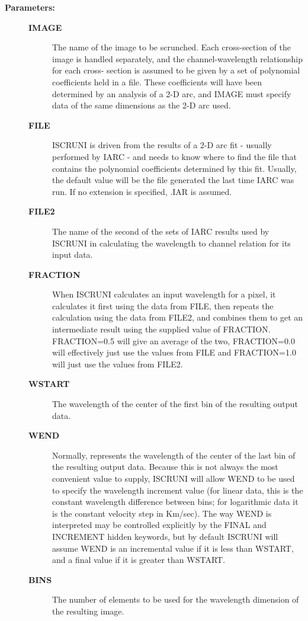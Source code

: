 \begin{description}
\item [{\bf Parameters:}]
\begin{description}
\item [{\bf IMAGE}]
 The name of the image to be scrunched.  Each
 cross-section of the image is handled separately, and
 the channel-wavelength relationship for each cross-
 section is assumed to be given by a set of polynomial
 coefficients held in a file.  These coefficients will
 have been determined by an analysis of a 2-D arc, and
 IMAGE must specify data of the same dimensions as the
 2-D arc used.
\item [{\bf FILE}]
 ISCRUNI is driven from the results of a 2-D arc fit -
 usually performed by IARC - and needs to know where to
 find the file that contains the polynomial coefficients
 determined by this fit.  Usually, the default value will
 be the file generated the last time IARC was run.  If no
 extension is specified, .IAR is assumed.
\item [{\bf FILE2}]
 The name of the second of the sets of IARC
 results used by ISCRUNI in calculating the wavelength to
 channel relation for its input data.
\item [{\bf FRACTION}]
 When ISCRUNI calculates an input wavelength for a pixel,
 it calculates it first using the data from FILE, then
 repeats the calculation using the data from FILE2, and
 combines them to get an intermediate result using the
 supplied value of FRACTION.  FRACTION=0.5 will give
 an average of the two, FRACTION=0.0 will effectively just
 use the values from FILE and FRACTION=1.0 will just use
 the values from FILE2.
\item [{\bf WSTART}]
 The wavelength of the center of the first bin
 of the resulting output data.
\item [{\bf WEND}]
 Normally, represents the wavelength of the center of
 the last bin of the resulting output data.  Because this
 is not always the most convenient value to supply, ISCRUNI
 will allow WEND to be used to specify the wavelength
 increment value (for linear data, this is the constant
 wavelength difference between bins; for logarithmic data
 it is the constant velocity step in Km/sec).  The way
 WEND is interpreted may be controlled explicitly by the
 FINAL and INCREMENT hidden keywords, but by default ISCRUNI
 will assume WEND is an incremental value if it is less than
 WSTART, and a final value if it is greater than WSTART.
\item [{\bf BINS}]
 The number of elements to be used for the
 wavelength dimension of the resulting image.

\end{description}
\end{description}

